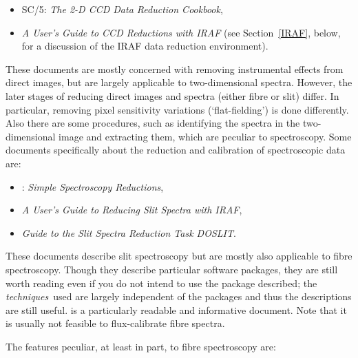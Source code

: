 \documentclass[chapters,twoside,11pt]{starlink}
\begin{document}
\begin{itemize}

  \item SC/5: \textit{The 2-D CCD Data Reduction Cookbook}\/\cite{SC5},

  \item \textit{A User's Guide to CCD Reductions with IRAF}\/\cite{MASSEY97}
   (see Section~\ref{IRAF}, below, for a discussion of the IRAF data
   reduction environment).

\end{itemize}

These documents are mostly concerned with removing instrumental effects
from direct images, but are largely applicable to two-dimensional
spectra.  However, the later stages of reducing direct images and
spectra (either fibre or slit) differ.  In particular, removing pixel
sensitivity variations (`flat-fielding') is done differently.  Also
there are some procedures, such as identifying the spectra in the
two-dimensional image and extracting them, which are peculiar to
spectroscopy.  Some documents specifically about the reduction and
calibration of spectroscopic data are:

\begin{itemize}

  \item {}: \textit{Simple Spectroscopy
   Reductions}\/\cite{SC7},

  \item \textit{A User's Guide to Reducing Slit Spectra with
   IRAF}\/\cite{MASSEY92},

  \item \textit{Guide to the Slit Spectra Reduction Task
   DOSLIT}\/\cite{VALDES92B}.

\end{itemize}

These documents describe slit spectroscopy but are mostly also
applicable to fibre spectroscopy.  Though they describe particular
software packages, they are still worth reading even if you do not
intend to use the package described; the \textit{techniques}\, used are
largely independent of the packages and thus the descriptions are still
useful.   is a particularly readable and informative
document.  Note that it is usually not feasible to flux-calibrate
fibre spectra.

The features peculiar, at least in part, to fibre spectroscopy are:
\end{document}
